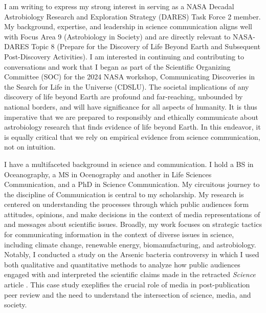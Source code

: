 \documentclass[12pt]{article}
\begin{document}
% 

I am writing to express my strong interest in serving as a NASA Decadal Astrobiology Research and Exploration Strategy (DARES) Task Force 2 member. My background, expertise, and leadership in science communication aligns well with Focus Area 9 (Astrobiology in Society) and are directly relevant to NASA-DARES Topic 8 (Prepare for the Discovery of Life Beyond Earth and Subsequent Post-Discovery Activities). I am interested in continuing and contributing to conversations and work that I began as part of the Scientific Organizing Committee (SOC) for the 2024 NASA workshop, Communicating Discoveries in the Search for Life in the Universe (CDSLU). The societal implications of any discovery of life beyond Earth are profound and far-reaching, unbounded by national borders, and will have significance for all aspects of humanity. It is thus imperative that we are prepared to responsibly and ethically communicate about astrobiology research that finds evidence of life beyond Earth. In this endeavor, it is equally critical that we rely on empirical evidence from science communication, not on intuition.

\vspace{1em}

I have a multifaceted background in science and communication. I hold a BS in Oceanography, a MS in Ocenography and another in Life Sciences Communication, and a PhD in Science Communication. My circuitous journey to the discipline of Communication is central to my scholarship. My research is centered on understanding the processes through which public audiences form attitudes, opinions, and make decisions in the context of media representations of and messages about scientific issues. Broadly, my work focuses on strategic tactics for communicating information in the context of diverse issues in science, including climate change, renewable energy, biomanufacturing, and astrobiology. Notably, I conducted a study on the Arsenic bacteria controversy \parencite{yeoCaseArseniclifeBlogs2017} in which I used both qualitative and quantitative methods to analyze how public audiences engaged with and interpreted the scientific claims made in the retracted \textit{Science} article \parencite{wolfe-simonBacteriumThatCan2011}. This case study exeplifies the crucial role of media in post-publication peer review and the need to understand the intersection of science, media, and society.
\end{document}
